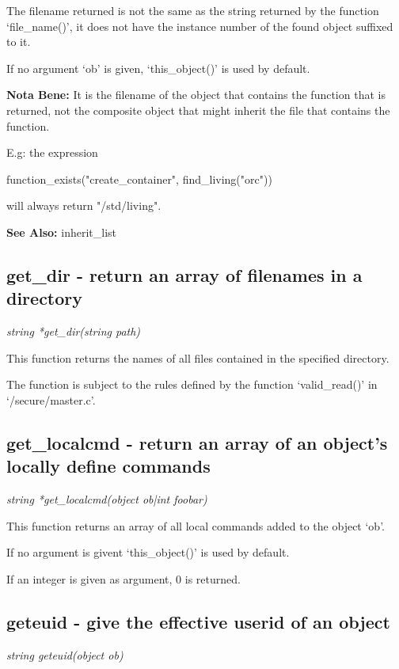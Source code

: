     The filename returned is not the same as the string returned by
    the function `file\_name()', it does not have the instance number
    of the found object suffixed to it.

    If no argument `ob' is given, `this\_object()' is used by default.

    {\bf Nota Bene: }   It is the filename of the object that contains the function that
    is returned, not the composite object that might inherit the file
    that contains the function.

    E.g: the expression 
    
        function\_exists("create\_container", find\_living("orc"))

    will always return "/std/living".

    {\bf See Also: }    inherit\_list


\subsection{get\_dir - return an array of filenames in a directory}

    {\em string *get\_dir(string path)}

    This function returns the names of all files contained in the
    specified directory.

    The function is subject to the rules defined by the function
    `valid\_read()' in `/secure/master.c'.



\subsection{get\_localcmd - return an array of an object's locally define commands}

    {\em string *get\_localcmd(object ob|int foobar)}

    This function returns an array of all local commands added to
    the object `ob'. 

    If no argument is givent `this\_object()' is used by default.

    If an integer is given as argument, 0 is returned.



\subsection{geteuid - give the effective userid of an object}

    {\em string geteuid(object ob)}

